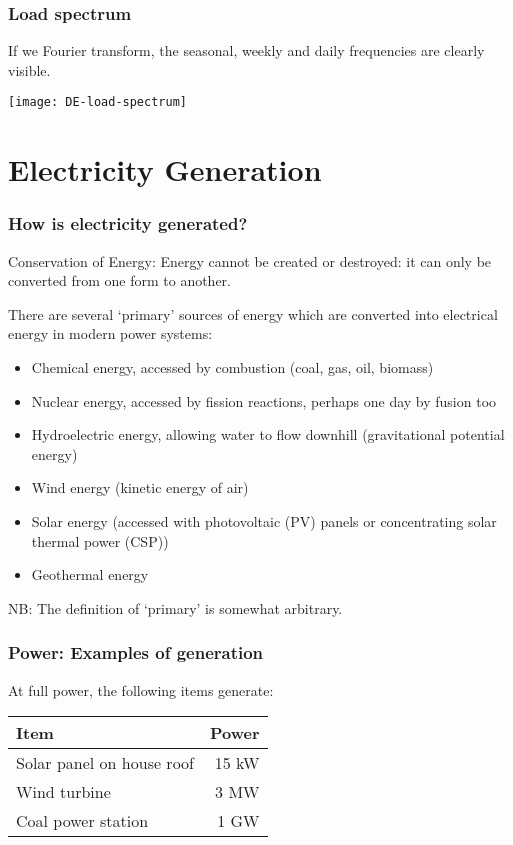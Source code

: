 \documentclass[10pt,aspectratio=169,dvipsnames]{beamer}
\newcommand{\ra}[1]{\renewcommand{\arraystretch}{#1}}
\let\olditem\item
\renewcommand{\item}{%
\olditem\vspace{5pt}}
\begin{document}
\begin{frame}
  \frametitle{Load spectrum}

  If we Fourier transform, the \alert{seasonal}, \alert{weekly} and \alert{daily} frequencies are clearly visible.

  \centering
  \texttt{[image: DE-load-spectrum]}

\end{frame}



\section{Electricity Generation}


\begin{frame}
  \frametitle{How is electricity generated?}

  \alert{Conservation of Energy}: Energy cannot be created or destroyed:
  it can only be converted from one form to another.

  There are several `primary' sources of energy which are converted
  into electrical energy in modern power systems:
  \begin{itemize}
  \item Chemical energy, accessed by combustion (coal, gas, oil, biomass)
  \item Nuclear energy, accessed by fission reactions, perhaps one day by fusion too
  \item Hydroelectric energy, allowing water to flow downhill (gravitational potential energy)
  \item Wind energy (kinetic energy of air)
  \item Solar energy (accessed with photovoltaic (PV) panels or
    concentrating solar thermal power (CSP))
  \item Geothermal energy
  \end{itemize}
  NB: The definition of `primary' is somewhat arbitrary.

\end{frame}



\begin{frame}
  \frametitle{Power: Examples of generation}

  At full power, the following items generate:

  \ra{1.1}
  \begin{table}[!t]
    \begin{tabular}{lr}
      \toprule
      Item & Power\\
      \midrule
      Solar panel on house roof & 15 kW \\
      Wind turbine & 3 MW \\
      Coal power station & 1 GW \\
      \bottomrule
    \end{tabular}
  \end{table}

\end{frame}
\end{document}
